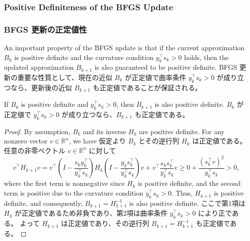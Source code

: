 \documentclass[0_main]{subfiles}
\begin{document}
\ifEn
    \subsubsection{Positive Definiteness of the BFGS Update}
\else
    \subsubsection{BFGS 更新の正定値性}
\fi

\ifEn
    An important property of the BFGS update is that if the current approximation $B_k$ is positive definite and the curvature condition $y_k^\top s_k > 0$ holds, then the updated approximation $B_{k+1}$ is also guaranteed to be positive definite.
\else
    BFGS 更新の重要な性質として、現在の近似 $B_k$ が正定値で曲率条件 $y_k^\top s_k > 0$ が成り立つなら、更新後の近似 $B_{k+1}$ も正定値であることが保証される。
\fi

\begin{proposition}
    \ifEn
        If $B_k$ is positive definite and $y_k^\top s_k > 0$, then $B_{k+1}$ is also positive definite.
    \else
        $B_k$ が正定値で $y_k^\top s_k > 0$ が成り立つなら、$B_{k+1}$ も正定値である。
    \fi
\end{proposition}
\begin{proof}
    \ifEn
        By assumption, $B_k$ and its inverse $H_k$ are positive definite.
        For any nonzero vector $v \in \mathbb{R}^n$, we have
    \else
        仮定より $B_k$ とその逆行列 $H_k$ は正定値である。
        任意の非零ベクトル $v \in \mathbb{R}^n$ に対して
    \fi
    \begin{equation*}
        v^\top H_{k+1} v
        = v^\top \left(I - \frac{s_k y_k^\top}{y_k^\top s_k}\right) H_k \left(I - \frac{y_k s_k^\top}{y_k^\top s_k}\right) v + v^\top \frac{s_k s_k^\top}{y_k^\top s_k} v
        \geq 0 + \frac{(s_k^\top v)^2}{y_k^\top s_k} > 0,
    \end{equation*}
    \ifEn
        where the first term is nonnegative since $H_k$ is positive definite, and the second term is positive due to the curvature condition $y_k^\top s_k > 0$.
        Thus, $H_{k+1}$ is positive definite, and consequently, $B_{k+1} = H_{k+1}^{-1}$ is also positive definite.
    \else
        ここで第1項は $H_k$ が正定値であるため非負であり、第2項は曲率条件 $y_k^\top s_k > 0$ により正である。
        よって $H_{k+1}$ は正定値であり、その逆行列 $B_{k+1} = H_{k+1}^{-1}$ も正定値である。
    \fi
    \myQED
\end{proof}
\end{document}
